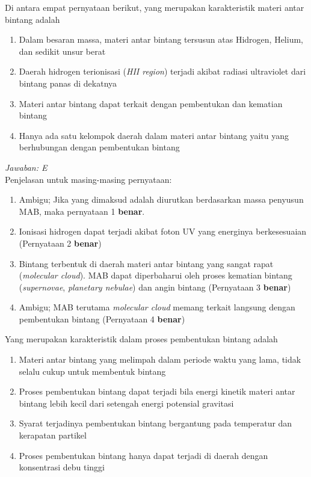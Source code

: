 \documentclass[11pt,fleqn, a4paper]{exam}
\begin{document}
\begin{questions}
\vspace{0.5cm}
\question Di antara empat pernyataan berikut, yang merupakan karakteristik materi antar bintang adalah
\begin{enumerate}
\item Dalam besaran massa, materi antar bintang tersusun atas Hidrogen, Helium, dan sedikit unsur berat 
\item Daerah hidrogen terionisasi (\textit{HII region}) terjadi akibat radiasi ultraviolet dari bintang panas di dekatnya
\item Materi antar bintang dapat terkait dengan pembentukan dan kematian bintang
\item Hanya ada satu kelompok daerah dalam materi antar bintang yaitu yang berhubungan dengan pembentukan bintang
\end{enumerate}

\textit{Jawaban: E}\\
Penjelasan untuk masing-masing pernyataan:
\begin{enumerate}
\item Ambigu; Jika yang dimaksud adalah diurutkan berdasarkan massa penyusun MAB, maka pernyataan 1 \textbf{benar}.
\item Ionisasi hidrogen dapat terjadi akibat foton UV yang energinya berkesesuaian (Pernyataan 2 \textbf{benar})
\item Bintang terbentuk di daerah materi antar bintang yang sangat rapat (\textit{molecular cloud}). MAB dapat diperbaharui oleh proses kematian bintang (\textit{supernovae}, \textit{planetary nebulae}) dan angin bintang (Pernyataan 3 \textbf{benar})
\item Ambigu; MAB terutama \textit{molecular cloud} memang terkait langsung dengan pembentukan bintang (Pernyataan 4 \textbf{benar})
\end{enumerate}


\vspace{0.5cm}
\question Yang merupakan karakteristik dalam proses pembentukan bintang adalah
\begin{enumerate}
\item Materi antar bintang yang melimpah dalam periode waktu yang lama, tidak selalu cukup untuk membentuk bintang
\item Proses pembentukan bintang dapat terjadi bila energi kinetik materi antar bintang lebih kecil dari setengah energi potensial gravitasi
\item Syarat terjadinya pembentukan bintang bergantung pada temperatur dan kerapatan partikel
\item Proses pembentukan bintang hanya dapat terjadi di daerah dengan konsentrasi debu tinggi
\end{enumerate}


\end{questions}
\end{document}
